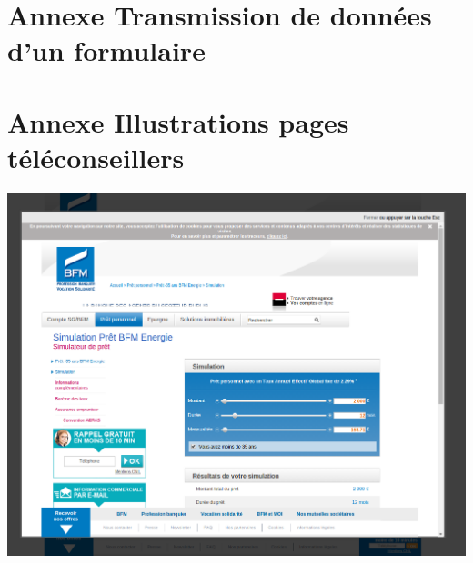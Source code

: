 \documentclass[a4paper,11pt,twoside]{report}
\begin{document}
    \newpage
  
  \section*{Annexe Transmission de données d'un formulaire}
  \label{transmission_de_donnees_d_un_formulaire}
  
  
    \newpage
  
  \section*{Annexe Illustrations pages téléconseillers}
  \label{illustrations_pages_teleconseillers}
  \begin{center}
      \includegraphics[width=\textwidth]{images/page_teleconseille2.png} 
      \label{page_teleconseille_popin_simulation}
  \end{center}
\end{document}
